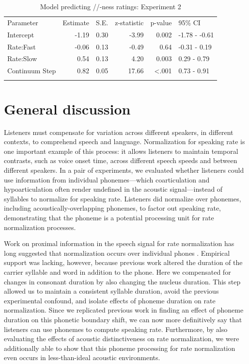 \begin{table}
\caption{\label{tab:exp2-sh-ness-model-summary}Model predicting /\textesh/-ness ratings: Experiment 2}
\centering
\begin{tabular}[t]{lrrrrl}
\hline\noalign{\smallskip}
Parameter & Estimate & S.E. & z-statistic & p-value & 95\% CI\\
\noalign{\smallskip}\hline\noalign{\smallskip}
Intercept & -1.19 & 0.30 & -3.99 & 0.002 & -1.78 - -0.61\\
Rate:Fast & -0.06 & 0.13 & -0.49 & 0.64 & -0.31 - 0.19\\
Rate:Slow & 0.54 & 0.13 & 4.20 & 0.003 & 0.29 - 0.79\\
Continuum Step & 0.82 & 0.05 & 17.66 & <.001 & 0.73 - 0.91\\
\noalign{\smallskip}\hline
\end{tabular}
\end{table}


\section{General discussion}

Listeners must compensate for variation across different speakers, in different contexts, to comprehend speech and language. Normalization for speaking rate is one important example of this process: it allows listeners to maintain temporal contrasts, such as voice onset time, across different speech speeds and between different speakers. In a pair of experiments, we evaluated whether listeners could use information from individual phonemes---which coarticulation and hypoarticulation often render undefined in the acoustic signal---instead of syllables to normalize for speaking rate. Listeners did normalize over phonemes, including acoustically-overlapping phonemes, to factor out speaking rate, demonstrating that the phoneme is a potential processing unit for rate normalization processes.

Work on proximal information in the speech signal for rate normalization has long suggested that normalization occurs over individual phones \citep{diehlAuditoryBasisStimulus1989,newmanPerceptualNormalizationSpeaking1996}. Empirical support was lacking, however, because previous work altered the duration of the carrier syllable and word in addition to the phone. Here we compensated for changes in consonant duration by also changing the nucleus duration. This step allowed us to maintain a consistent syllable duration, avoid the previous experimental confound, and isolate effects of phoneme duration on rate normalization. Since we replicated previous work in finding an effect of phoneme duration on this phonetic boundary shift, we can now more definitively say that listeners can use phonemes to compute speaking rate. Furthermore, by also evaluating the effects of acoustic distinctiveness on rate normalization, we were additionally able to show that this phoneme processing for rate normalization even occurs in less-than-ideal acoustic environments. 

